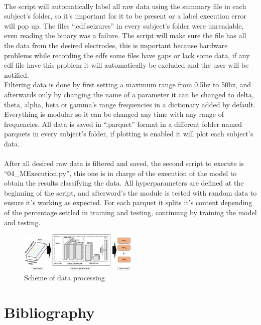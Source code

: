 ﻿\documentclass[10pt,a4paper,twocolumn,twoside]{article}
\begin{document}
\leavevmode\\
The script will automatically label all raw data using the summary file in each subject’s folder, so it’s important for it to be present or a label execution error will pop up. The files “.edf.seizures” in every subject’s folder were unreadable, even reading the binary was a failure. The script will make sure the file has all the data from the desired electrodes, this is important because hardware problems while recording the edfs some files have gaps or lack some data, if any edf file have this problem it will automatically be excluded and the user will be notified.
\\
Filtering data is done by first setting a maximum range from 0.5hz to 50hz, and afterwards only by changing the name of a parameter it can be changed to delta, theta, alpha, beta or gamma’s range frequencies in a dictionary added by default. Everything is modular so it can be changed any time with any range of frequencies. All data is saved in “.parquet” format in a different folder named parquets in every subject’s folder, if plotting is enabled it will plot each subject’s data.
\\
\\
After all desired raw data is filtered and saved, the second script to execute is “04\_MExecution.py”, this one is in charge of the execution of the model to obtain the results classifying the data. All hyperparameters are defined at the beginning of the script, and afterword’s the module is tested with random data to ensure it’s working as expected. For each parquet it splits it’s content depending of the percentage settled in training and testing, continuing by training the model and testing.
\\

\begin{figure}[h]
  \caption{Scheme of data processing }
  \centering
  \includegraphics[width=0.5\textwidth]{img/FeatureProjectorModel.png}
  \end{figure}




\section{Bibliography}
\label{sec-bibliography}

\printbibliography

\end{document}
